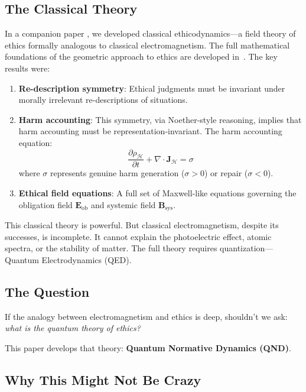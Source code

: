 \documentclass[12pt]{article}
\begin{document}
\subsection{The Classical Theory}

In a companion paper \cite{bond2025noether}, we developed classical ethicodynamics---a field theory of ethics formally analogous to classical electromagnetism. The full mathematical foundations of the geometric approach to ethics are developed in~\cite{bond2026ge}. The key results were:

\begin{enumerate}
    \item \textbf{Re-description symmetry}: Ethical judgments must be invariant under morally irrelevant re-descriptions of situations.

    \item \textbf{Harm accounting}: This symmetry, via Noether-style reasoning, implies that harm accounting must be representation-invariant. The harm accounting equation:
    \begin{equation}
        \frac{\partial \rho_{\mathcal{H}}}{\partial t} + \nabla \cdot \mathbf{J}_{\mathcal{H}} = \sigma
    \end{equation}
    where $\sigma$ represents genuine harm generation ($\sigma > 0$) or repair ($\sigma < 0$).

    \item \textbf{Ethical field equations}: A full set of Maxwell-like equations governing the obligation field $\mathbf{E}_{\text{ob}}$ and systemic field $\mathbf{B}_{\text{sys}}$.
\end{enumerate}

This classical theory is powerful. But classical electromagnetism, despite its successes, is incomplete. It cannot explain the photoelectric effect, atomic spectra, or the stability of matter. The full theory requires quantization---Quantum Electrodynamics (QED).

\subsection{The Question}

If the analogy between electromagnetism and ethics is deep, shouldn't we ask: \emph{what is the quantum theory of ethics?}

This paper develops that theory: \textbf{Quantum Normative Dynamics (QND)}.

\subsection{Why This Might Not Be Crazy}
\end{document}
